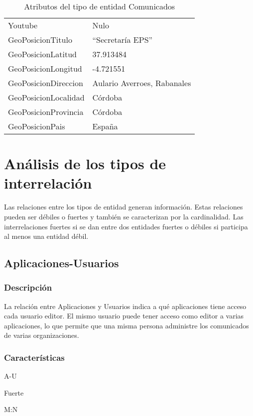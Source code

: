 \begin{table}[h!]
\begin{tabular}{|ll|}
        Youtube & Nulo \\
        GeoPosicionTitulo & ``Secretaría EPS'' \\
        GeoPosicionLatitud & 37.913484 \\
        GeoPosicionLongitud & -4.721551 \\
        GeoPosicionDireccion & Aulario Averroes, Rabanales \\
        GeoPosicionLocalidad & Córdoba \\
        GeoPosicionProvincia & Córdoba \\
        GeoPosicionPais & España \\
        \hline
    \end{tabular}%
    \caption{Atributos del tipo de entidad Comunicados}
    \label{cuadro:ejemplo-comunicados}
\end{table}

\section {Análisis de los tipos de interrelación}
Las relaciones entre los tipos de entidad generan información. Estas relaciones pueden ser débiles o fuertes y también se caracterizan por la cardinalidad.
Las interrelaciones fuertes si se dan entre dos entidades fuertes o débiles si participa al menos una entidad débil.


\subsection{Aplicaciones-Usuarios}
\subsubsection*{Descripción}
La relación entre Aplicaciones y Usuarios indica a qué aplicaciones tiene acceso cada usuario editor. El mismo usuario puede tener acceso como editor a varias aplicaciones, lo que permite que una misma persona administre los comunicados de varias organizaciones.

\subsubsection*{Características}
\begin{description}[nosep,style=multiline,labelindent=0.8cm,leftmargin=4.5cm,font=\normalfont]
    \item[Nombre] A-U
    \item[Tipo] Fuerte
    \item[Cardinalidad] M:N
\end{description}
